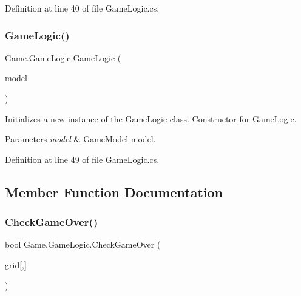 Definition at line 40 of file Game\+Logic.\+cs.

\mbox{\label{class_game_1_1_game_logic_af24244d8756f86b6ef14fdfb3e60edff}} 
\subsubsection{\texorpdfstring{GameLogic()}{GameLogic()}\hspace{0.1cm}{\footnotesize\ttfamily [2/2]}}
{\footnotesize\ttfamily Game.\+Game\+Logic.\+Game\+Logic (\begin{DoxyParamCaption}\item[{\mbox{\hyperlink{class_game_1_1_game_model}{Game\+Model}}}]{model }\end{DoxyParamCaption})}



Initializes a new instance of the \mbox{\hyperlink{class_game_1_1_game_logic}{Game\+Logic}} class. Constructor for \mbox{\hyperlink{class_game_1_1_game_logic}{Game\+Logic}}. 


\begin{DoxyParams}{Parameters}
{\em model} & \mbox{\hyperlink{class_game_1_1_game_model}{Game\+Model}} model.\\
\hline
\end{DoxyParams}


Definition at line 49 of file Game\+Logic.\+cs.



\subsection{Member Function Documentation}
\mbox{\label{class_game_1_1_game_logic_a11500e039be202e200db57b10afd7261}} 
\subsubsection{\texorpdfstring{CheckGameOver()}{CheckGameOver()}}
{\footnotesize\ttfamily bool Game.\+Game\+Logic.\+Check\+Game\+Over (\begin{DoxyParamCaption}\item[{\mbox{\hyperlink{class_game_1_1_tile}{Tile}}}]{grid\mbox{[},\mbox{]} }\end{DoxyParamCaption})}



